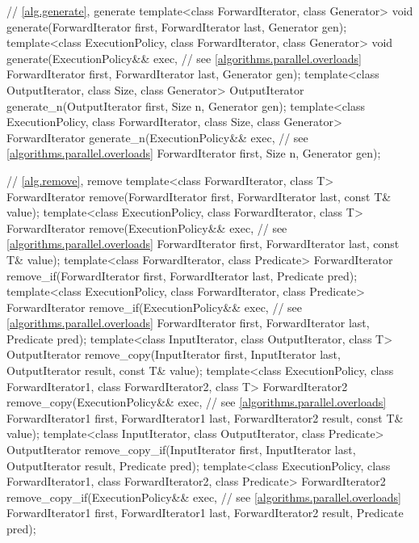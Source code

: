 \begin{codeblock}
{  // \ref{alg.generate}, generate
  template<class ForwardIterator, class Generator>
    void generate(ForwardIterator first, ForwardIterator last,
                  Generator gen);
  template<class ExecutionPolicy, class ForwardIterator, class Generator>
    void generate(ExecutionPolicy&& exec, // see \ref{algorithms.parallel.overloads}
                  ForwardIterator first, ForwardIterator last,
                  Generator gen);
  template<class OutputIterator, class Size, class Generator>
    OutputIterator generate_n(OutputIterator first, Size n, Generator gen);
  template<class ExecutionPolicy, class ForwardIterator, class Size, class Generator>
    ForwardIterator generate_n(ExecutionPolicy&& exec, // see \ref{algorithms.parallel.overloads}
                               ForwardIterator first, Size n, Generator gen);

  // \ref{alg.remove}, remove
  template<class ForwardIterator, class T>
    ForwardIterator remove(ForwardIterator first, ForwardIterator last,
                           const T& value);
  template<class ExecutionPolicy, class ForwardIterator, class T>
    ForwardIterator remove(ExecutionPolicy&& exec, // see \ref{algorithms.parallel.overloads}
                           ForwardIterator first, ForwardIterator last,
                           const T& value);
  template<class ForwardIterator, class Predicate>
    ForwardIterator remove_if(ForwardIterator first, ForwardIterator last,
                              Predicate pred);
  template<class ExecutionPolicy, class ForwardIterator, class Predicate>
    ForwardIterator remove_if(ExecutionPolicy&& exec, // see \ref{algorithms.parallel.overloads}
                              ForwardIterator first, ForwardIterator last,
                              Predicate pred);
  template<class InputIterator, class OutputIterator, class T>
    OutputIterator remove_copy(InputIterator first, InputIterator last,
                               OutputIterator result, const T& value);
  template<class ExecutionPolicy, class ForwardIterator1, class ForwardIterator2,
           class T>
    ForwardIterator2 remove_copy(ExecutionPolicy&& exec, // see \ref{algorithms.parallel.overloads}
                                 ForwardIterator1 first, ForwardIterator1 last,
                                 ForwardIterator2 result, const T& value);
  template<class InputIterator, class OutputIterator, class Predicate>
    OutputIterator remove_copy_if(InputIterator first, InputIterator last,
                                  OutputIterator result, Predicate pred);
  template<class ExecutionPolicy, class ForwardIterator1, class ForwardIterator2,
           class Predicate>
    ForwardIterator2 remove_copy_if(ExecutionPolicy&& exec, // see \ref{algorithms.parallel.overloads}
                                    ForwardIterator1 first, ForwardIterator1 last,
                                    ForwardIterator2 result, Predicate pred);

}
\end{codeblock}
